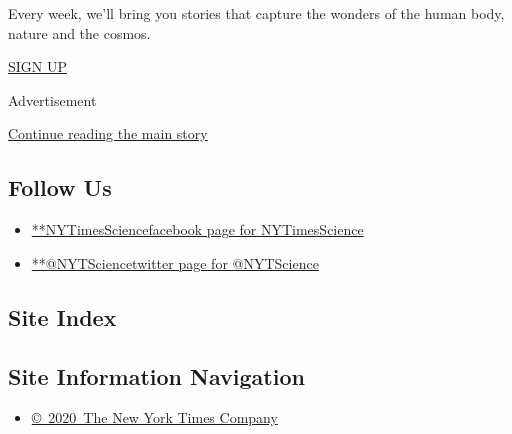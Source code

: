 Every week, we'll bring you stories that capture the wonders of the
human body, nature and the cosmos.

\href{/newsletters/signup/SC}{SIGN UP}

Advertisement

\protect\hyperlink{after-mktg}{Continue reading the main story}

\hypertarget{follow-us}{%
\subsection{Follow Us}\label{follow-us}}

\begin{itemize}
\tightlist
\item
  \href{https://www.facebook.com/NYTimesScience}{**NYTimesSciencefacebook
  page for NYTimesScience}
\item
  \href{https://twitter.com/NYTScience}{**@NYTSciencetwitter page for
  @NYTScience}
\end{itemize}

\hypertarget{site-index}{%
\subsection{Site Index}\label{site-index}}

\hypertarget{site-information-navigation}{%
\subsection{Site Information
Navigation}\label{site-information-navigation}}

\begin{itemize}
\tightlist
\item
  \href{https://help.nytimes.com/hc/en-us/articles/115014792127-Copyright-notice}{©~2020~The
  New York Times Company}
\end{itemize}

